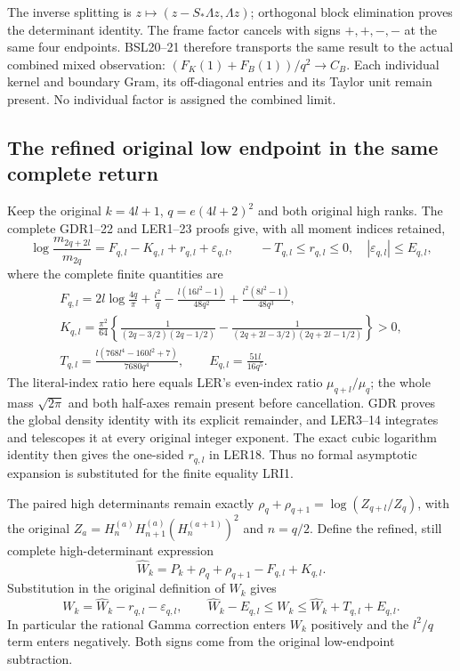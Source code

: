\documentclass[11pt,a4paper]{article}
\begin{document}
The inverse splitting is $z\mapsto(z-S_*\Lambda z,\Lambda z)$;
orthogonal block elimination proves the determinant identity.
The frame factor cancels with signs $+,+,-,-$ at the same four
endpoints. BSL20--21 therefore transports the same result to the
actual combined mixed observation:
$(F_K(1)+F_B(1))/q^2\to C_B$. Each individual kernel and
boundary Gram, its off-diagonal entries and its Taylor unit
remain present. No individual factor is assigned the combined limit.


\subsection{The refined original low endpoint in the same complete return}

Keep the original $k=4l+1$, $q=e(4l+2)^2$ and both original
high ranks. The complete GDR1--22 and LER1--23 proofs give,
with all moment indices retained,
\[
 \log\frac{m_{2q+2l}}{m_{2q}}
 =F_{q,l}-K_{q,l}+r_{q,l}+\varepsilon_{q,l},\qquad
 -T_{q,l}\leq r_{q,l}\leq0,\quad
 |\varepsilon_{q,l}|\leq E_{q,l},
 \tag{LRI1}
\]
where the complete finite quantities are
\[
\begin{gathered}
 F_{q,l}=2l\log\frac{4q}{\pi}+\frac{l^2}{q}
 -\frac{l(16l^2-1)}{48q^2}
 +\frac{l^2(8l^2-1)}{48q^3},\\
 K_{q,l}=\frac{\pi^2}{64}\left\{
 \frac1{(2q-3/2)(2q-1/2)}
 -\frac1{(2q+2l-3/2)(2q+2l-1/2)}\right\}>0,\\
 T_{q,l}=\frac{l(768l^4-160l^2+7)}{7680q^4},\qquad
 E_{q,l}=\frac{51l}{16q^5}.
\end{gathered}\tag{LRI2}
\]
The literal-index ratio here equals LER's even-index ratio
$\mu_{q+l}/\mu_q$; the whole mass $\sqrt{2\pi}$ and both
half-axes remain present before cancellation. GDR proves the
global density identity with its explicit remainder, and LER3--14
integrates and telescopes it at every original integer exponent.
The exact cubic logarithm identity then gives the one-sided
$r_{q,l}$ in LER18. Thus no formal asymptotic expansion is
substituted for the finite equality LRI1.

The paired high determinants remain exactly
$\rho_q+\rho_{q+1}=\log(Z_{q+l}/Z_q)$, with the original
$Z_a=H_n^{(a)}H_{n+1}^{(a)}(H_n^{(a+1)})^2$ and $n=q/2$.
Define the refined, still complete high-determinant expression
\[
 \widehat W_k=P_k+\rho_q+\rho_{q+1}-F_{q,l}+K_{q,l}.
\]
Substitution in the original definition of $W_k$ gives
\[
 W_k=\widehat W_k-r_{q,l}-\varepsilon_{q,l},\qquad
 \widehat W_k-E_{q,l}\leq W_k
                  \leq\widehat W_k+T_{q,l}+E_{q,l}.
 \tag{LRI3}
\]
In particular the rational Gamma correction enters $W_k$
positively and the $l^2/q$ term enters negatively. Both signs
come from the original low-endpoint subtraction.
\end{document}

